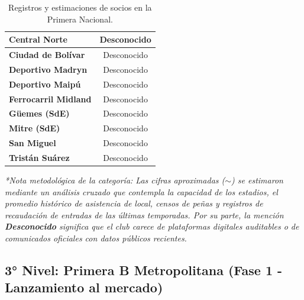 \begin{table}[h!]
\begin{tabularx}{\textwidth}{|X|c|}
\textbf{Central Norte} & Desconocido \\ \hline
\textbf{Ciudad de Bolívar} & Desconocido \\ \hline
\textbf{Deportivo Madryn} & Desconocido \\ \hline
\textbf{Deportivo Maipú} & Desconocido \\ \hline
\textbf{Ferrocarril Midland} & Desconocido \\ \hline
\textbf{Güemes (SdE)} & Desconocido \\ \hline
\textbf{Mitre (SdE)} & Desconocido \\ \hline
\textbf{San Miguel} & Desconocido \\ \hline
\textbf{Tristán Suárez} & Desconocido \\ \hline
\end{tabularx}
\caption{Registros y estimaciones de socios en la Primera Nacional.}
\label{tab:anexo_primera_nacional}
\end{table}

\textit{*Nota metodológica de la categoría: Las cifras aproximadas ($\sim$) se estimaron mediante un análisis cruzado que contempla la capacidad de los estadios, el promedio histórico de asistencia de local, censos de peñas y registros de recaudación de entradas de las últimas temporadas. Por su parte, la mención \textbf{Desconocido} significa que el club carece de plataformas digitales auditables o de comunicados oficiales con datos públicos recientes.}

\newpage

\subsection{3° Nivel: Primera B Metropolitana (Fase 1 - Lanzamiento al mercado)}

